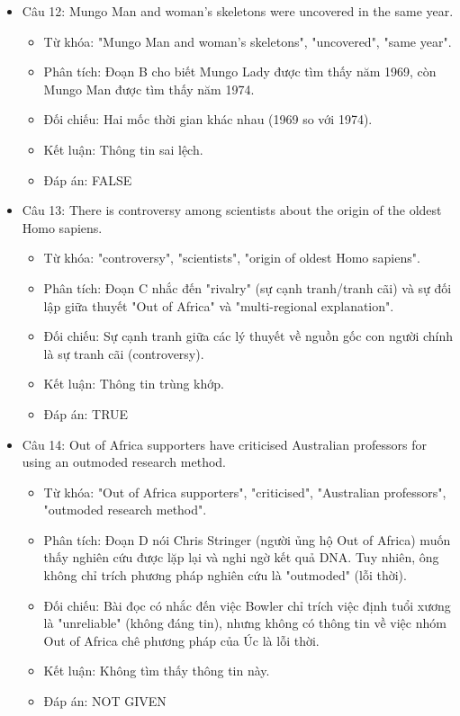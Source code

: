 \documentclass{../templateReading/cdreading}
\begin{document}
\begin{itemize}
\begin{itemize}
\item Kết luận: Thông tin đúng.
\item Đáp án: TRUE
\end{itemize}
\item Câu 12: Mungo Man and woman’s skeletons were uncovered in the same year.
\begin{itemize}
\item Từ khóa: "Mungo Man and woman’s skeletons", "uncovered", "same year".
\item Phân tích: Đoạn B cho biết Mungo Lady được tìm thấy năm 1969, còn Mungo Man được tìm thấy năm 1974.
\item Đối chiếu: Hai mốc thời gian khác nhau (1969 so với 1974).
\item Kết luận: Thông tin sai lệch.
\item Đáp án: FALSE
\end{itemize}
\item Câu 13: There is controversy among scientists about the origin of the oldest Homo sapiens.
\begin{itemize}
\item Từ khóa: "controversy", "scientists", "origin of oldest Homo sapiens".
\item Phân tích: Đoạn C nhắc đến "rivalry" (sự cạnh tranh/tranh cãi) và sự đối lập giữa thuyết "Out of Africa" và "multi-regional explanation".
\item Đối chiếu: Sự cạnh tranh giữa các lý thuyết về nguồn gốc con người chính là sự tranh cãi (controversy).
\item Kết luận: Thông tin trùng khớp.
\item Đáp án: TRUE
\end{itemize}
\item Câu 14: Out of Africa supporters have criticised Australian professors for using an outmoded research method.
\begin{itemize}
\item Từ khóa: "Out of Africa supporters", "criticised", "Australian professors", "outmoded research method".
\item Phân tích: Đoạn D nói Chris Stringer (người ủng hộ Out of Africa) muốn thấy nghiên cứu được lặp lại và nghi ngờ kết quả DNA. Tuy nhiên, ông không chỉ trích phương pháp nghiên cứu là "outmoded" (lỗi thời).
\item Đối chiếu: Bài đọc có nhắc đến việc Bowler chỉ trích việc định tuổi xương là "unreliable" (không đáng tin), nhưng không có thông tin về việc nhóm Out of Africa chê phương pháp của Úc là lỗi thời.
\item Kết luận: Không tìm thấy thông tin này.
\item Đáp án: NOT GIVEN
\end{itemize}
\end{itemize}
\end{document}
